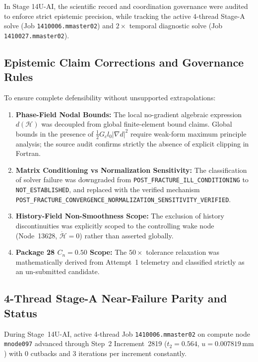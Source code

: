 In Stage 14U-AI, the scientific record and coordination governance were audited to enforce strict epistemic precision, while tracking the active 4-thread Stage-A solve (Job \texttt{1410006.mmaster02}) and $2\times$ temporal diagnostic solve (Job \texttt{1410027.mmaster02}).

\subsection{Epistemic Claim Corrections and Governance Rules}
\label{subsec:stage14uai_epistemic_corrections}

To ensure complete defensibility without unsupported extrapolations:
\begin{enumerate}
  \item \textbf{Phase-Field Nodal Bounds:} The local no-gradient algebraic expression $d(\mathcal{H})$ was decoupled from global finite-element bound claims. Global bounds in the presence of $\frac{1}{2} G_c l_0 |\nabla d|^2$ require weak-form maximum principle analysis; the source audit confirms strictly the absence of explicit clipping in Fortran.
  \item \textbf{Matrix Conditioning vs Normalization Sensitivity:} The classification of solver failure was downgraded from \texttt{POST\_FRACTURE\_ILL\_CONDITIONING} to \texttt{NOT\_ESTABLISHED}, and replaced with the verified mechanism \texttt{POST\_FRACTURE\_CONVERGENCE\_NORMALIZATION\_SENSITIVITY\_VERIFIED}.
  \item \textbf{History-Field Non-Smoothness Scope:} The exclusion of history discontinuities was explicitly scoped to the controlling wake node (Node~13628, $\dot{\mathcal{H}} = 0$) rather than asserted globally.
  \item \textbf{Package 28 $C_n = 0.50$ Scope:} The $50\times$ tolerance relaxation was mathematically derived from Attempt~1 telemetry and classified strictly as an un-submitted candidate.
\end{enumerate}

\subsection{4-Thread Stage-A Near-Failure Parity and Status}
\label{subsec:stage14uai_4thread_parity_audit}

During Stage~14U-AI, active 4-thread Job \texttt{1410006.mmaster02} on compute node \texttt{mnode097} advanced through Step~2 Increment~2819 ($t_2 = 0.564$, $u = 0.007819\,\mathrm{mm}$) with 0 cutbacks and 3 iterations per increment constantly. 

